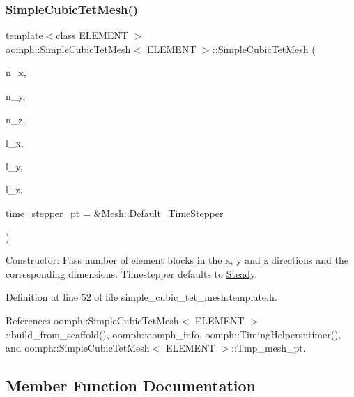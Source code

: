 \subsubsection{\texorpdfstring{Simple\+Cubic\+Tet\+Mesh()}{SimpleCubicTetMesh()}}
{\footnotesize\ttfamily template$<$class E\+L\+E\+M\+E\+NT $>$ \\
\hyperlink{classoomph_1_1SimpleCubicTetMesh}{oomph\+::\+Simple\+Cubic\+Tet\+Mesh}$<$ E\+L\+E\+M\+E\+NT $>$\+::\hyperlink{classoomph_1_1SimpleCubicTetMesh}{Simple\+Cubic\+Tet\+Mesh} (\begin{DoxyParamCaption}\item[{const unsigned \&}]{n\+\_\+x,  }\item[{const unsigned \&}]{n\+\_\+y,  }\item[{const unsigned \&}]{n\+\_\+z,  }\item[{const double \&}]{l\+\_\+x,  }\item[{const double \&}]{l\+\_\+y,  }\item[{const double \&}]{l\+\_\+z,  }\item[{\hyperlink{classoomph_1_1TimeStepper}{Time\+Stepper} $\ast$}]{time\+\_\+stepper\+\_\+pt = {\ttfamily \&\hyperlink{classoomph_1_1Mesh_a12243d0fee2b1fcee729ee5a4777ea10}{Mesh\+::\+Default\+\_\+\+Time\+Stepper}} }\end{DoxyParamCaption})\hspace{0.3cm}{\ttfamily [inline]}}



Constructor\+: Pass number of element blocks in the x, y and z directions and the corresponding dimensions. Timestepper defaults to \hyperlink{classoomph_1_1Steady}{Steady}. 



Definition at line 52 of file simple\+\_\+cubic\+\_\+tet\+\_\+mesh.\+template.\+h.



References oomph\+::\+Simple\+Cubic\+Tet\+Mesh$<$ E\+L\+E\+M\+E\+N\+T $>$\+::build\+\_\+from\+\_\+scaffold(), oomph\+::oomph\+\_\+info, oomph\+::\+Timing\+Helpers\+::timer(), and oomph\+::\+Simple\+Cubic\+Tet\+Mesh$<$ E\+L\+E\+M\+E\+N\+T $>$\+::\+Tmp\+\_\+mesh\+\_\+pt.



\subsection{Member Function Documentation}
\mbox{\label{classoomph_1_1SimpleCubicTetMesh_a558c1fcc4bd91cdb2830977df2171537}} 
